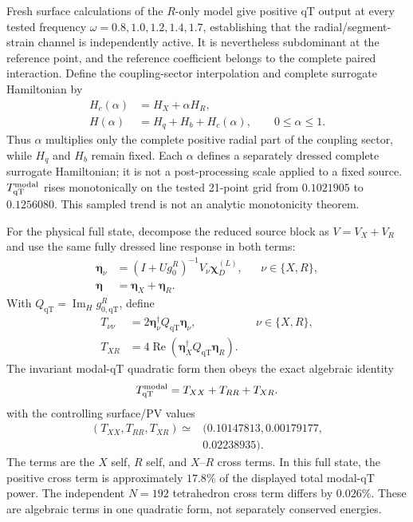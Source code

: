 \documentclass[10pt,aps,pre,reprint,floatfix,notitlepage,nofootinbib]{revtex4-2}
\newcommand{\vchi}{\bm{\chi}}
\newcommand{\veta}{\bm{\eta}}
\newcommand{\qT}{\mathrm{qT}}
\newcommand{\ImH}{\operatorname{Im}_{\!H}}
\begin{document}
Fresh surface calculations of the $R$-only model give positive $\qT$ output at every tested frequency $\omega=0.8,1.0,1.2,1.4,1.7$, establishing that the radial/segment-strain channel is independently active. It is nevertheless subdominant at the reference point, and the reference coefficient belongs to the complete paired interaction. Define the coupling-sector interpolation and complete surrogate Hamiltonian by
\begin{equation}
\begin{aligned}
 H_c(\alpha)&=H_X+\alpha H_R,\\
 H(\alpha)&=H_q+H_b+H_c(\alpha),
 \qquad0\leq\alpha\leq1.
\end{aligned}
 \label{eq:s6-alpha-family}
\end{equation}
Thus $\alpha$ multiplies only the complete positive radial part of the coupling sector, while $H_q$ and $H_b$ remain fixed. Each $\alpha$ defines a separately dressed complete surrogate Hamiltonian; it is not a post-processing scale applied to a fixed source. $T_{\qT}^{\rm modal}$ rises monotonically on the tested 21-point grid from $0.1021905$ to $0.1256080$. This sampled trend is not an analytic monotonicity theorem.

For the physical full state, decompose the reduced source block as $V=V_X+V_R$ and use the same fully dressed line response in both terms:
\begin{equation}
\begin{aligned}
  \veta_\nu&=(I+Ug_0^R)^{-1}V_\nu\vchi_D^{(L)},
  &&\nu\in\{X,R\},\\
  \veta&=\veta_X+\veta_R.
\end{aligned}
  \label{eq:s6-same-state-source}
\end{equation}
With $Q_{\qT}=\ImH g_{0,\qT}^R$, define
\begin{equation}
\begin{aligned}
  T_{\nu\nu}&=2\veta_\nu^\dagger Q_{\qT}\veta_\nu,
  &&\nu\in\{X,R\},\\
  T_{XR}&=4\operatorname{Re}
  \left(\veta_X^\dagger Q_{\qT}\veta_R\right).
\end{aligned}
  \label{eq:s6-same-state-terms}
\end{equation}
The invariant modal-qT quadratic form then obeys the exact algebraic identity
\begin{equation}
 T_{\qT}^{\rm modal}=T_{XX}+T_{RR}+T_{XR}.
 \label{eq:s6-same-state-XR}
\end{equation}
with the controlling surface/PV values
\begin{equation}
 \begin{split}
 (T_{XX},T_{RR},T_{XR})\simeq{}&
 (0.10147813,0.00179177,\\
 &0.02238935).
 \end{split}
\end{equation}
The terms are the $X$ self, $R$ self, and $X$--$R$ cross terms. In this full state, the positive cross term is approximately $17.8\%$ of the displayed total modal-qT power. The independent $N=192$ tetrahedron cross term differs by $0.026\%$. These are algebraic terms in one quadratic form, not separately conserved energies.
\end{document}
